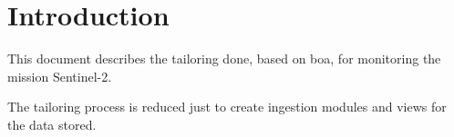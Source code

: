 \chapter{Introduction}\label{c:intro}

This document describes the tailoring done, based on \acrshort{boa}, for monitoring the mission Sentinel-2.

The tailoring process is reduced just to create ingestion modules and views for the data stored.
